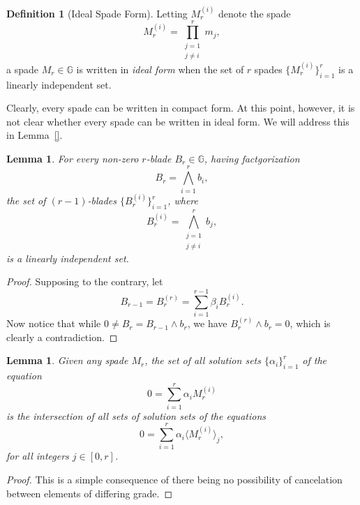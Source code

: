\documentclass{birkjour}
\newtheorem{lem}[thm]{Lemma}
\theoremstyle{definition}
\newtheorem{defn}[thm]{Definition}
\theoremstyle{remark}
\numberwithin{equation}{section}
\newcommand{\G}{\mathbb{G}}
\begin{document}
\begin{defn}[Ideal Spade Form]
Letting $M_r^{(i)}$ denote the spade
\begin{equation*}
M_r^{(i)}=\prod_{\substack{j=1\\j\neq i}}^r m_j,
\end{equation*}
a spade $M_r\in\G$ is written in \emph{ideal form} when the set of $r$ spades $\{M_r^{(i)}\}_{i=1}^r$
is a linearly independent set.
\end{defn}

Clearly, every spade can be written in compact form.
At this point, however, it is not clear whether every spade can be written in ideal form.
We will address this in Lemma~\ref{}.

\begin{lem}\label{lem_lin_indep_blades}
For every non-zero $r$-blade $B_r\in\G$, having factgorization
\begin{equation*}
B_r = \bigwedge_{i=1}^r b_i,
\end{equation*}
the set of $(r-1)$-blades $\{B_r^{(i)}\}_{i=1}^r$, where
\begin{equation*}
B_r^{(i)}=\bigwedge_{\substack{j=1\\j\neq i}}^r b_j,
\end{equation*}
is a linearly independent set.
\end{lem}
\begin{proof}
Supposing to the contrary, let
\begin{equation*}
B_{r-1} = B_r^{(r)} = \sum_{i=1}^{r-1}\beta_i B_r^{(i)}.
\end{equation*}
Now notice that while $0\neq B_r=B_{r-1}\wedge b_r$, we have $B_r^{(r)}\wedge b_r=0$, which
is clearly a contradiction.
\end{proof}

\begin{lem}\label{lem_solution_intersection}
Given any spade $M_r$, the set of all solution sets $\{\alpha_i\}_{i=1}^r$ of the equation
\begin{equation*}
0 = \sum_{i=1}^r\alpha_i M_r^{(i)}
\end{equation*}
is the intersection of all sets of solution sets of the equations
\begin{equation*}
0 = \sum_{i=1}^r\alpha_i\langle M_r^{(i)}\rangle_j,
\end{equation*}
for all integers $j\in[0,r]$.
\end{lem}
\begin{proof}
This is a simple consequence of there being no possibility of cancelation between elements of differing grade.
\end{proof}
\end{document}
